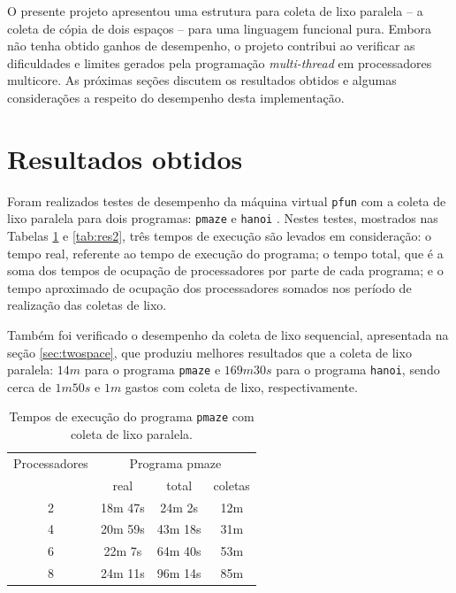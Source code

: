 \documentclass[ccc, pg2]{esinucpel}
\begin{document}
O presente projeto apresentou uma estrutura para coleta de lixo paralela -- a coleta de cópia de dois espaços -- para uma linguagem funcional pura. Embora não tenha obtido ganhos de desempenho, o projeto contribui ao verificar as dificuldades e limites gerados pela programação {\it multi-thread} em processadores multicore. As próximas seções discutem os resultados obtidos e algumas considerações a respeito do desempenho desta implementação. %

\section{Resultados obtidos}
Foram realizados testes de desempenho da máquina virtual {\tt pfun} com a coleta de lixo paralela para dois programas: {\tt pmaze} e {\tt hanoi} \cite{bib:beloni}. Nestes testes, mostrados nas Tabelas \ref{tab:res} e \ref{tab:res2}, três tempos de execução são levados em consideração: o tempo real, referente ao tempo de execução do programa; o tempo total, que é a soma dos tempos de ocupação de processadores por parte de cada programa; e o tempo aproximado de ocupação dos processadores somados nos período de realização das coletas de lixo.

Também foi verificado o desempenho da coleta de lixo sequencial, apresentada na seção \ref{sec:twospace}, que produziu melhores resultados que a coleta de lixo paralela: $14m$ para o programa {\tt pmaze} e $169m 30s$ para o programa {\tt hanoi}, sendo cerca de $1m 50s$ e $1m$ gastos com coleta de lixo, respectivamente.

\begin{table}[h]
\centering
	\begin{tabular}{c|c|c|c}
	\hline
	Processadores	& \multicolumn{3}{c}{Programa pmaze} \\
	\cline{2-4}
								& real			& total 		& coletas \\
	\hline
	2							&	18m 47s		&	24m 2s 		& 12m \\
	\hline
	4							& 20m 59s		& 43m 18s 	& 31m \\
	\hline
	6							& 22m 7s		& 64m 40s 	& 53m \\
	\hline
	8							& 24m 11s		& 96m 14s 	& 85m \\
	\hline
	\end{tabular}
\caption{Tempos de execução do programa {\tt pmaze} com coleta de lixo paralela.}
\label{tab:res}
\end{table}
\end{document}
